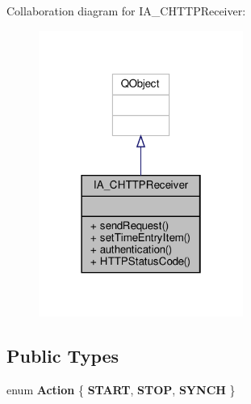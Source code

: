 Collaboration diagram for I\+A\+\_\+\+C\+H\+T\+T\+P\+Receiver\+:
\nopagebreak
\begin{figure}[H]
\begin{center}
\leavevmode
\includegraphics[width=190pt]{classIA__CHTTPReceiver__coll__graph}
\end{center}
\end{figure}
\subsection*{Public Types}
\begin{DoxyCompactItemize}
\item 
\mbox{\label{classIA__CHTTPReceiver_a858658f31b35242035c5651f6d17d871}} 
enum {\bfseries Action} \{ {\bfseries S\+T\+A\+RT}, 
{\bfseries S\+T\+OP}, 
{\bfseries S\+Y\+N\+CH}
 \}
\end{DoxyCompactItemize}
